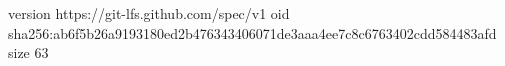 version https://git-lfs.github.com/spec/v1
oid sha256:ab6f5b26a9193180ed2b476343406071de3aaa4ee7c8c6763402cdd584483afd
size 63
